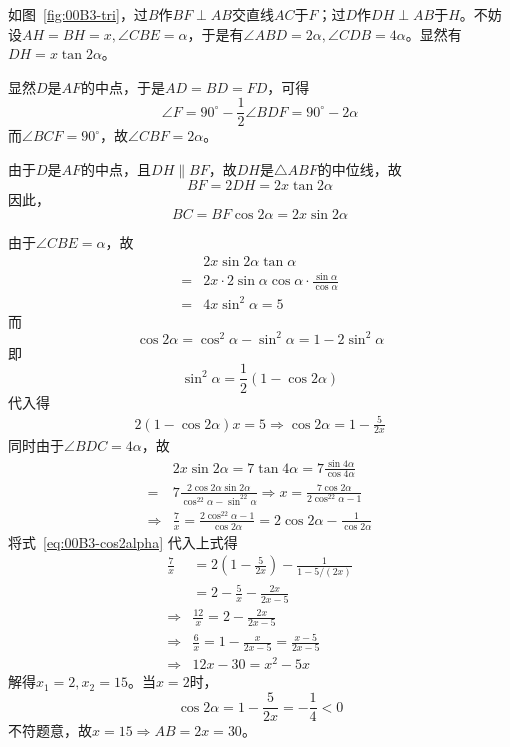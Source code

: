 如图~\ref{fig:00B3-tri}，过$B$作$BF \perp AB$交直线$AC$于$F$；过$D$作$DH \perp AB$于$H$。不妨设$AH = BH = x, \angle CBE = \alpha$，于是有$\angle ABD = 2\alpha, \angle CDB = 4\alpha$。显然有$DH = x\tan2\alpha$。

显然$D$是$AF$的中点，于是$AD = BD = FD$，可得
\[ \angle F = 90^\circ - \frac12\angle BDF = 90^\circ - 2\alpha \]
而$\angle BCF = 90^\circ$，故$\angle CBF = 2\alpha$。

由于$D$是$AF$的中点，且$DH \parallel BF$，故$DH$是$\triangle ABF$的中位线，故
\[ BF = 2DH = 2x\tan2\alpha \]
因此，
\[ BC = BF\cos2\alpha = 2x\sin2\alpha \]

由于$\angle CBE = \alpha$，故
\begin{align*}
  & 2x\sin2\alpha\tan\alpha \\
  ={}& 2x\cdot2\sin\alpha\cos\alpha\cdot\frac{\sin\alpha}{\cos\alpha} \\
  ={}& 4x\sin^2\alpha = 5
\end{align*}
而
\[ \cos2\alpha = \cos^2\alpha - \sin^2\alpha = 1 - 2\sin^2\alpha \]
即
\[ \sin^2\alpha = \frac12(1 - \cos2\alpha) \]
代入得
\begin{align}
  2(1 - \cos2\alpha)x = 5 \Rightarrow \cos2\alpha = 1 - \frac5{2x} \label{eq:00B3-cos2alpha}
\end{align}
同时由于$\angle BDC = 4\alpha$，故
\begin{align*}
  & 2x\sin2\alpha = 7\tan4\alpha = 7\frac{\sin4\alpha}{\cos4\alpha} \\
  ={}& 7\frac{2\cos2\alpha\sin2\alpha}{\cos^22\alpha - \sin^22\alpha} \Rightarrow x = \frac{7\cos2\alpha}{2\cos^22\alpha - 1} \\
  \Rightarrow{}& \frac7x = \frac{2\cos^22\alpha - 1}{\cos2\alpha} = 2\cos2\alpha - \frac1{\cos2\alpha}
\end{align*}
将式~\ref{eq:00B3-cos2alpha} 代入上式得
\begin{align*}
  \frac7x &= 2\left(1 - \frac5{2x}\right) - \frac1{1 - 5/(2x)} \\
  &= 2 - \frac5x - \frac{2x}{2x - 5} \\
  \Rightarrow{}& \frac{12}x = 2 - \frac{2x}{2x - 5} \\
  \Rightarrow{}& \frac6x = 1 - \frac x{2x - 5} = \frac{x - 5}{2x - 5} \\
  \Rightarrow{}& 12x - 30 = x^2 - 5x
\end{align*}
解得$x_1 = 2, x_2 = 15$。当$x = 2$时，
\[ \cos2\alpha = 1 - \frac5{2x} = -\frac14 < 0 \]
不符题意，故$x = 15 \Rightarrow AB = 2x = 30$。
